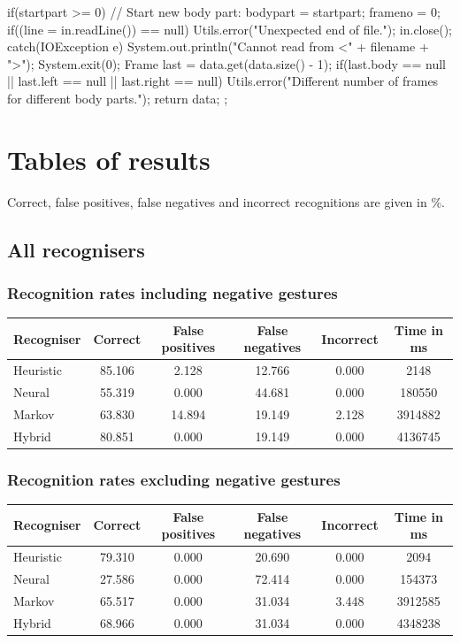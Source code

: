 \documentclass[12pt,a4,notitlepage]{report}
\renewcommand{\_}{\texttt{\symbol{95}}}
\newcommand{\<}{\texttt{\symbol{60}}}
\renewcommand{\>}{\texttt{\symbol{62}}}
\begin{document}
\begin{code}
{{{{            if(startpart >= 0)
            {
               // Start new body part:
               bodypart = startpart;
               frameno = 0;
               if((line = in.readLine()) == null)
                  Utils.error("Unexpected end of file.");
            }
         }
         in.close();
      }
      catch(IOException e)
      {
         System.out.println("Cannot read from <" + filename + ">");
         System.exit(0);
      }
      Frame last = data.get(data.size() - 1);
      if(last.body == null || last.left == null || last.right == null)
         Utils.error("Different number of frames for different body parts.");
      return data;
   }
};


\end{code}

\chapter{Tables of results}

Correct, false positives, false negatives and incorrect recognitions are given in \%.

\section{All recognisers}

\subsection{Recognition rates including negative gestures}

\begin{tabular}{l|ccccc}
Recogniser & Correct & False positives & False negatives & Incorrect & Time in ms \\ \hline
Heuristic & 85.106 & 2.128 & 12.766 & 0.000 & 2148 \\
Neural & 55.319 & 0.000 & 44.681 & 0.000 & 180550 \\
Markov & 63.830 & 14.894 & 19.149 & 2.128 & 3914882	\\
Hybrid & 80.851 & 0.000 & 19.149 & 0.000 & 4136745 \\
\end{tabular}	

\subsection{Recognition rates excluding negative gestures}

\begin{tabular}{l|ccccc}
Recogniser & Correct & False positives & False negatives & Incorrect & Time in ms \\ \hline
Heuristic & 79.310 & 0.000 & 20.690 & 0.000 & 2094	\\
Neural & 27.586 & 0.000 & 72.414 & 0.000 & 154373	\\
Markov & 65.517 & 0.000 & 31.034 & 3.448 & 3912585	\\
Hybrid & 68.966 & 0.000 & 31.034 & 0.000 & 4348238	\\
\end{tabular}	
\end{document}
